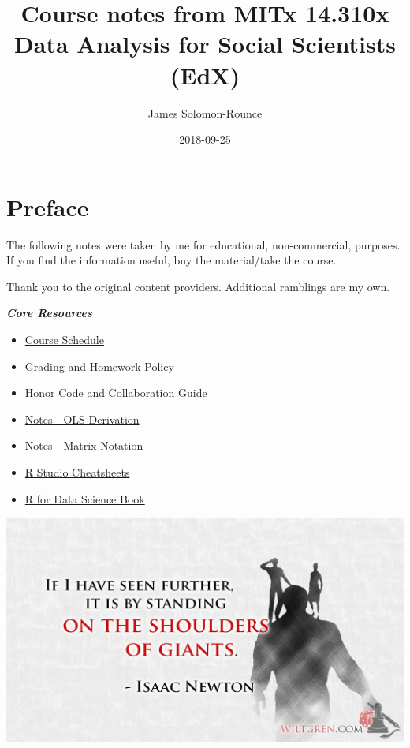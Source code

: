 \documentclass[]{book}
\title{Course notes from MITx 14.310x Data Analysis for Social Scientists (EdX)}
\author{James Solomon-Rounce}
\date{2018-09-25}
\providecommand{\tightlist}{%
  \setlength{\itemsep}{0pt}\setlength{\parskip}{0pt}}
\theoremstyle{definition}
\theoremstyle{definition}
\theoremstyle{definition}
\theoremstyle{remark}
\begin{document}
\maketitle

{
\setcounter{tocdepth}{1}
\tableofcontents
}
\chapter*{Preface}\label{preface}

The following notes were taken by me for educational, non-commercial,
purposes. If you find the information useful, buy the material/take the
course.

Thank you to the original content providers. Additional ramblings are my
own.

\textbf{\emph{Core Resources}}

\begin{itemize}
\tightlist
\item
  \href{./files/14.310x_3T2018_Schedule.pdf}{Course Schedule}
\item
  \href{./files/14.310x_Grading_and_Homework_Policy__3T2018.pdf}{Grading
  and Homework Policy}
\item
  \href{./files/14310x_Honor_Code_and_Collaboration_Guidelines.pdf}{Honor
  Code and Collaboration Guide}
\item
  \href{./files/Derivation_of_OLS_Estimators.pdf}{Notes - OLS
  Derivation}
\item
  \href{./files/Matrix_Notation_etc.pdf}{Notes - Matrix Notation}
\item
  \href{https://www.rstudio.com/resources/cheatsheets/}{R Studio
  Cheatsheets}
\item
  \href{http://r4ds.had.co.nz/index.html}{R for Data Science Book}
\end{itemize}

\includegraphics[width=1\linewidth]{images/standing}
\end{document}
